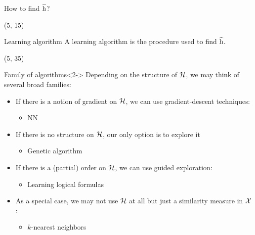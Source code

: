 \begin{frame}{How to find $\widehat{\mathrm{h}}$?}

  \begin{textblock}{90}(5, 15)
    \begin{block}{Learning algorithm}
      A learning algorithm is the procedure used to find $\widehat{\mathrm{h}}$.
    \end{block}
  \end{textblock}

  \begin{textblock}{90}(5, 35)
    \begin{block}{Family of algorithms}<2->
      Depending on the structure of $\mathcal{H}$, we may think of several broad families:
      \begin{itemize}
      \item<3-> If there is a notion of gradient on $\mathcal{H}$, we can use
        gradient-descent techniques:
        \begin{itemize}
        \item \acl{NN}
        \end{itemize}
      \item<4-> If there is no structure on $\mathcal{H}$, our only option is to explore
        it
        \begin{itemize}
        \item Genetic algorithm
        \end{itemize}
      \item<5-> If there is a (partial) order on $\mathcal{H}$, we can use guided exploration:
        \begin{itemize}
        \item Learning logical formulas
        \end{itemize}
      \item<6-> As a special case, we may not use $\mathcal{H}$ at all but just a
        similarity measure in $\mathcal{X}$:
        \begin{itemize}
        \item $k$-nearest neighbors
        \end{itemize}
      \end{itemize}
      \end{block}
  \end{textblock}
\end{frame}


